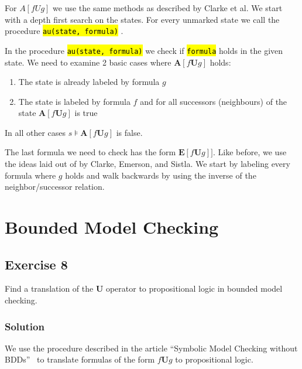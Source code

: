 \documentclass[a4paper, 12pt]{article}
\newcommand{\codeinput}[1]
{
    \begin{leftbar}
        {\fontsize{9pt}{11pt}}
    \end{leftbar}
}
\newcommand{\code}[1]
{
    \hl{\texttt{#1}}
}
\begin{document}
\codeinput{label_EX}

For $A[f U g]$ we use the same methods as described by Clarke et al. We start
with a depth first search on the states. For every unmarked state we call the
procedure \code{au(state, formula)}.

\codeinput{label_AU}

In the procedure \code{au(state, formula)} we check if \code{formula} holds in
the given state. We need to examine 2 basic cases where $\textbf{A}[f
\textbf{U} g]$ holds:

\begin{enumerate}

    \item The state is already labeled by formula $g$

    \item The state is labeled by formula $f$ and for all successors
    (neighbours) of the state $\textbf{A}[f \textbf{U}g]$ is true

\end{enumerate}

In all other cases $s⊧\mathbf{A}[f \mathbf{U} g]$ is false.

\codeinput{au}

The last formula we need to check has the form $\mathbf{E}[f \mathbf{U} g]]$.
Like before, we use the ideas laid out of by Clarke, Emerson, and Sistla. We
start by labeling every formula where $g$ holds and walk backwards by using
the inverse of the neighbor/successor relation.

\codeinput{label_EU}

\section{Bounded Model Checking}

\subsection{Exercise 8}

Find a translation of the $\mathbf{U}$ operator to propositional logic in
bounded model checking.

\subsubsection{Solution}

We use the procedure described in the article “Symbolic Model Checking without
BDDs”~\cite{Biere1999SymbolicModelChecking} to translate formulas of the form
$f\mathbf{U}g$ to propositional logic.
\end{document}
